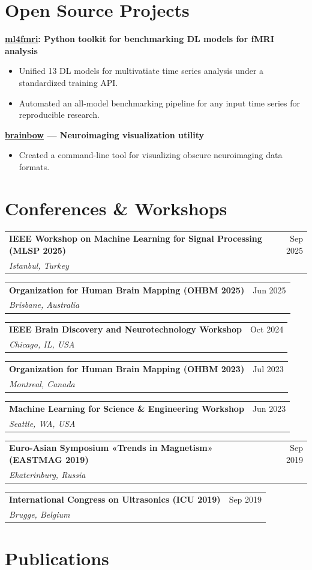 \documentclass[11pt,a4paper]{article}
\begin{document}
\newpage

\section*{Open Source Projects}
\noindent\textbf{\href{https://pypi.org/project/ml4fmri/}{ml4fmri}: Python toolkit for benchmarking DL models for fMRI analysis}\\
[-2em]
\begin{itemize}[leftmargin=*,noitemsep]
    \item Unified 13 DL models for multivatiate time series analysis under a standardized training API.
    \item Automated an all-model benchmarking pipeline for any input time series for reproducible research.
\end{itemize}

\noindent\textbf{\href{https://pypi.org/project/brainbow/}{brainbow} — Neuroimaging visualization utility}\\
[-2em]
\begin{itemize}[leftmargin=*,noitemsep]
    \item Created a command-line tool for visualizing obscure neuroimaging data formats.
\end{itemize}


\section*{Conferences \& Workshops}
\newcommand{\confattend}[4][1.2em]{%
\noindent\begin{tabular*}{\linewidth}{@{\extracolsep{\fill}} l r}
  \hspace*{#1}\textbf{#2} & #4 \\
  \hspace*{#1}\emph{#3} &
\end{tabular*}\par\vspace{0.25em}
}

\confattend{IEEE Workshop on Machine Learning for Signal Processing (MLSP 2025)}{Istanbul, Turkey}{Sep 2025}
\confattend{Organization for Human Brain Mapping (OHBM 2025)}{Brisbane, Australia}{Jun 2025}
\confattend{IEEE Brain Discovery and Neurotechnology Workshop}{Chicago, IL, USA}{Oct 2024}
\confattend{Organization for Human Brain Mapping (OHBM 2023)}{Montreal, Canada}{Jul 2023}
\confattend{Machine Learning for Science \& Engineering Workshop}{Seattle, WA, USA}{Jun 2023}
\confattend{Euro-Asian Symposium «Trends in Magnetism» (EASTMAG 2019)}{Ekaterinburg, Russia}{Sep 2019}
\confattend{International Congress on Ultrasonics (ICU 2019)}{Brugge, Belgium}{Sep 2019}




\section*{Publications}
\nocite{meanMLP}
\nocite{PhysRevAppl2020}
\nocite{JMMM2019}
\nocite{RiEl2018}
\nocite{zafar}
\nocite{decifra_mlsp}
\nocite{bottleneck_tmi}
\nocite{vanduyn}


\printbibliography[
heading=none, 
sorting=ydnt
]
\end{document}
